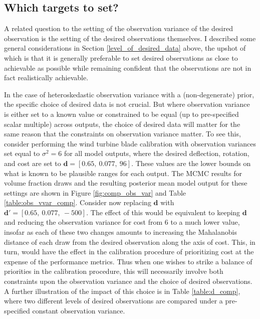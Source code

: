 \documentclass{article}
\begin{document}

\subsection{Which targets to set?}\label{which_data}

A related question to the setting of the observation variance of the desired observation is the setting of the desired observations themselves. I described some general considerations in Section \ref{level_of_desired_data} above, the upshot of which is that it is generally preferable to set desired observations as close to achievable as possible while remaining confident that the observations are not in fact realistically achievable. 

In the case of heteroskedastic observation variance with a (non-degenerate) prior, the specific choice of desired data is not crucial. But where observation variance is either set to a known value or constrained to be equal (up to pre-specified scalar multiple) across outputs, the choice of desired data will matter for the same reason that the constraints on observation variance matter. To see this, consider performing the wind turbine blade calibration with observation variances set equal to $\sigma^2=6$ for all model outputs, where the desired deflection, rotation, and cost are set to $\mathbf d=[0.65,\ 0.077,\ 96]$. These values are the lower bounds on what is known to be plausible ranges for each output. The MCMC results for volume fraction draws and the resulting posterior mean model output for these settings are shown in Figure \ref{fig:comp_obs_var} and Table \ref{table:obs_vvar_comp}. Consider now replacing $\mathbf d$ with $\mathbf d'=[0.65,\ 0.077,\ -500]$. The effect of this would be equivalent to keeping $\mathbf d$ and reducing the observation variance for cost from 6 to a much lower value, insofar as each of these two changes amounts to increasing the Mahalanobis distance of each draw from the desired observation along the axis of cost. This, in turn, would have the effect in the calibration procedure of prioritizing cost at the expense of the performance metrics. Thus when one wishes to strike a balance of priorities in the calibration procedure, this will necessarily involve both constraints upon the observation variance and the choice of desired observations. A further illustration of the impact of this choice is in Table \ref{table:d_comp}, where two different levels of desired observations are compared under a pre-specified constant observation variance.
\end{document}
